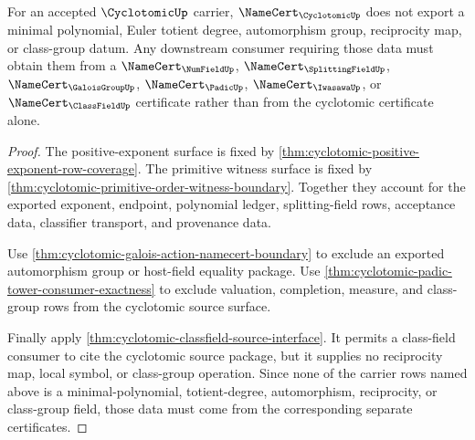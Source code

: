 \begin{theorem}
\label{thm:cyclotomic-minimal-polynomial-nonexport}
For an accepted $\CyclotomicUp$ carrier, $\NameCert_{\CyclotomicUp}$ does not export a minimal polynomial, Euler totient degree, automorphism group, reciprocity map, or class-group datum. Any downstream consumer requiring those data must obtain them from a $\NameCert_{\NumFieldUp}$, $\NameCert_{\SplittingFieldUp}$, $\NameCert_{\GaloisGroupUp}$, $\NameCert_{\PadicUp}$, $\NameCert_{\IwasawaUp}$, or $\NameCert_{\ClassFieldUp}$ certificate rather than from the cyclotomic certificate alone.
\end{theorem}
\begin{proof}
The positive-exponent surface is fixed by \autoref{thm:cyclotomic-positive-exponent-row-coverage}. The primitive witness surface is fixed by \autoref{thm:cyclotomic-primitive-order-witness-boundary}. Together they account for the exported exponent, endpoint, polynomial ledger, splitting-field rows, acceptance data, classifier transport, and provenance data.

Use \autoref{thm:cyclotomic-galois-action-namecert-boundary} to exclude an exported automorphism group or host-field equality package. Use \autoref{thm:cyclotomic-padic-tower-consumer-exactness} to exclude valuation, completion, measure, and class-group rows from the cyclotomic source surface.

Finally apply \autoref{thm:cyclotomic-classfield-source-interface}. It permits a class-field consumer to cite the cyclotomic source package, but it supplies no reciprocity map, local symbol, or class-group operation. Since none of the carrier rows named above is a minimal-polynomial, totient-degree, automorphism, reciprocity, or class-group field, those data must come from the corresponding separate certificates.
\end{proof}

